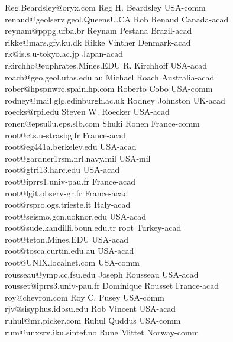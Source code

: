\begin{tabbing}
Reg.Beardsley@oryx.com \> Reg H. Beardsley \> USA-comm\\
renaud@geolserv.geol.QueensU.CA \> Rob Renaud \> Canada-acad\\
reynam@pppg.ufba.br \> Reynam Pestana \> Brazil-acad\\
rikke@mars.gfy.ku.dk \> Rikke Vinther \> Denmark-acad\\
rk@is.s.u-tokyo.ac.jp \> \> Japan-acad\\
rkirchho@euphrates.Mines.EDU \> R. Kirchhoff \> USA-acad\\
roach@geo.geol.utas.edu.au \> Michael Roach \> Australia-acad\\
rober@hpspnwrc.spain.hp.com \> Roberto Cobo \> USA-comm\\
rodney@mail.glg.edinburgh.ac.uk \> Rodney Johnston \> UK-acad\\
roecks@rpi.edu \> Steven W. Roecker \> USA-acad\\
ronen@epsu0u.eps.slb.com \> Shuki Ronen \>  France-comm\\
root@cts.u-strasbg.fr \> \> France-acad\\
root@eg441a.berkeley.edu \> \> USA-acad\\
root@gardner1rsm.nrl.navy.mil \>\> USA-mil\\
root@gtri13.harc.edu \> \> USA-acad\\
root@iprrs1.univ-pau.fr \> \> France-acad\\
root@lgit.observ-gr.fr \> \> France-acad\\
root@rspro.ogs.trieste.it \> \> Italy-acad \\
root@seismo.gcn.uoknor.edu \> \> USA-acad\\
root@sude.kandilli.boun.edu.tr \> root \> Turkey-acad\\
root@teton.Mines.EDU \> \> USA-acad\\
root@tosca.curtin.edu.au \> \> USA-acad\\
root@UNIX.localnet.com \> \> USA-comm\\
rousseau@ymp.cc.fsu.edu \> Joseph Rousseau \> USA-acad\\
rousset@iprrs3.univ-pau.fr \> Dominique Rousset \> France-acad\\
roy@chevron.com \> Roy C. Pusey \> USA-comm\\
rjv@sisyphus.idbsu.edu \> Rob Vincent \> USA-acad\\
ruhul@mr.picker.com \> Ruhul Quddus \> USA-comm\\
rum@unxsrv.iku.sintef.no \> Rune Mittet \> Norway-comm\\

\end{tabbing}
